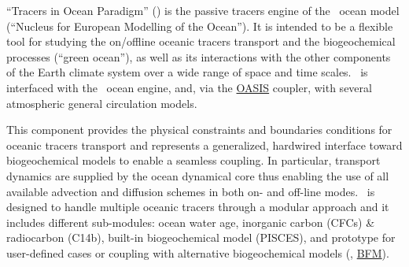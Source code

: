 
``Tracers in Ocean Paradigm'' (\TOP) is the passive tracers engine of
the \NEMO\ ocean model (``Nucleus for European Modelling of the Ocean'').
It is intended to be a flexible tool for studying the on/offline oceanic tracers transport and
the biogeochemical processes (``green ocean''),
as well as its interactions with the other components of the Earth climate system over
a wide range of space and time scales.
\TOP\ is interfaced with the \NEMO\ ocean engine, and,
via the \href{http://portal.enes.org/oasis}{OASIS} coupler,
with several atmospheric general circulation models.

This component provides the physical constraints and boundaries conditions for
oceanic tracers transport and represents a generalized, hardwired interface toward
biogeochemical models to enable a seamless coupling.
In particular, transport dynamics are supplied by the ocean dynamical core thus
enabling the use of all available advection and diffusion schemes in both on- and off-line modes.
\TOP\ is designed to handle multiple oceanic tracers through a modular approach and
it includes different sub-modules: ocean water age, inorganic carbon (CFCs) \& radiocarbon (C14b),
built-in biogeochemical model (PISCES), and prototype for user-defined cases or
coupling with alternative biogeochemical models (\eg, \href{http://www.bfm-community.eu}{BFM}).
